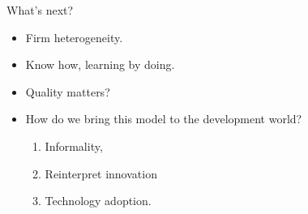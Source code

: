 \documentclass[usenames,dvipsnames,aspectratio=169]{beamer}
\begin{document}
\begin{frame}{What's next?}
    \begin{itemize}
        \item Firm heterogeneity. 
        \item Know how, learning by doing. 
        \item Quality  matters? 
        \item How do we bring this model to the development world?
        \begin{enumerate}
            \item Informality, 
            \item Reinterpret innovation
            \item Technology adoption. 
        \end{enumerate}
    \end{itemize}
\end{frame}
\end{document}
